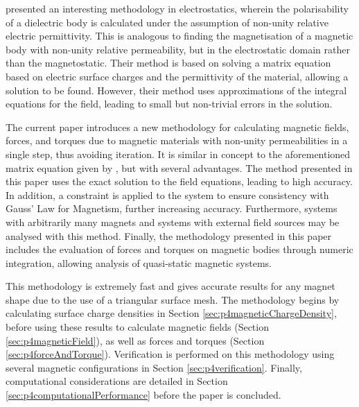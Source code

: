 \textcite[Sec~2.6]{Harrington1993} presented an interesting methodology in electrostatics, wherein the polarisability of a dielectric body is calculated under the assumption of non-unity relative electric permittivity. This is analogous to finding the magnetisation of a magnetic body with non-unity relative permeability, but in the electrostatic domain rather than the magnetostatic. Their method is based on solving a matrix equation based on electric surface charges and the permittivity of the material, allowing a solution to be found. However, their method uses approximations of the integral equations for the field, leading to small but non-trivial errors in the solution.

The current paper introduces a new methodology for calculating magnetic fields, forces, and torques due to magnetic materials with non-unity permeabilities in a single step, thus avoiding iteration. It is similar in concept to the aforementioned matrix equation given by \textcite[Sec~2.6]{Harrington1993}, but with several advantages. The method presented in this paper uses the exact solution to the field equations, leading to high accuracy. In addition, a constraint is applied to the system to ensure consistency with Gauss' Law for Magnetism, further increasing accuracy. Furthermore, systems with arbitrarily many magnets and systems with external field sources may be analysed with this method. Finally, the methodology presented in this paper includes the evaluation of forces and torques on magnetic bodies through numeric integration, allowing analysis of quasi-static magnetic systems.

This methodology is extremely fast and gives accurate results for any magnet shape due to the use of a triangular surface mesh. The methodology begins by calculating surface charge densities in Section \ref{sec:p4magneticChargeDensity}, before using these results to calculate magnetic fields (Section \ref{sec:p4magneticField}), as well as forces and torques (Section \ref{sec:p4forceAndTorque}). Verification is performed on this methodology using several magnetic configurations in Section \ref{sec:p4verification}. Finally, computational considerations are detailed in Section \ref{sec:p4computationalPerformance} before the paper is concluded.